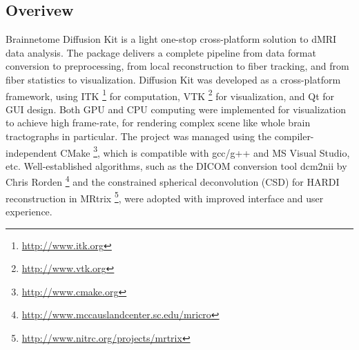 \documentclass[letterpaper,10pt,english]{sphinxmanual}
\begin{document}
\subsection{Overivew}
\label{overview::doc}\label{overview:overivew}
Brainnetome Diffusion Kit is a light one-stop cross-platform solution to dMRI data analysis. The package delivers a complete pipeline from data format conversion to preprocessing, from local reconstruction to fiber tracking, and from fiber statistics to visualization. Diffusion Kit was developed as a cross-platform framework, using ITK \footnote{
\href{http://www.itk.org}{http://www.itk.org}
} for computation, VTK \footnote{
\href{http://www.vtk.org}{http://www.vtk.org}
} for visualization, and Qt for GUI design. Both GPU and CPU computing were implemented for visualization to achieve high frame-rate, for rendering complex scene like whole brain tractographs in particular. The project was managed using the compiler-independent CMake \footnote{
\href{http://www.cmake.org}{http://www.cmake.org}
}, which is compatible with gcc/g++ and MS Visual Studio, etc. Well-established algorithms, such as the DICOM conversion tool dcm2nii by Chris Rorden \footnote{
\href{http://www.mccauslandcenter.sc.edu/mricro}{http://www.mccauslandcenter.sc.edu/mricro}
} and the constrained spherical deconvolution (CSD) for HARDI reconstruction in MRtrix \footnote{
\href{http://www.nitrc.org/projects/mrtrix}{http://www.nitrc.org/projects/mrtrix}
}, were adopted with improved interface and user experience.
\end{document}

